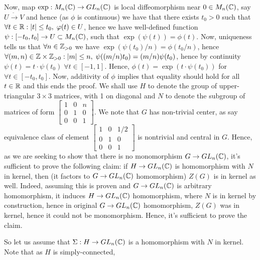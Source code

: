 \documentclass[8pt]{article} %
\begin{document}
Now, map $\exp:M_n(\mathbb{C})\to GL_n(\mathbb{C})$ is local diffeomorphism near $0\in M_n(\mathbb{C})$, say $U\xrightarrow{ \widetilde{} }V$
and hence (as $\phi$ is continuous) we have that
there exists $t_0>0$ such that $\forall t\in\mathbb{R}:\left|t\right|\leq t_0,\;\varphi(t)\in U$, hence we have well-defined function
$\psi:[-t_0,t_0]\to U\subset M_n(\mathbb{C})$, such that $\exp(\psi(t))=\phi(t)$. Now, uniqueness tells us that
$\forall n\in\mathbb{Z}_{>0}$ we have $\exp(\psi(t_0)/n)=\phi(t_0/n)$, hence $\forall (m,n)\in \mathbb{Z}\times\mathbb{Z}_{>0}:\left|m\right|\leq n,\;
\psi((m/n)t_0)=(m/n)\psi(t_0)$, hence by continuity $\psi(t)=t\cdot\psi(t_0)\;\forall t\in[-1,1]$. Hence, $\phi(t)=\exp(t\cdot
\psi(t_0))$ for $\forall t\in[-t_0,t_0]$. Now, additivity of $\phi$ implies that equality should hold for all $t\in\mathbb{R}$ and this
ends the proof.
We shall use $H$ to denote the group of upper-triangular $3\times3$ matrices, with 1 on diagonal and $N$ to denote the
subgroup of matrices of form $\left[\begin{smallmatrix}1&0&n\\0&1&0\\0&0&1\end{smallmatrix}\right]$.
We note that $G$ has non-trivial center, as say equivalence class of element
$\left[\begin{smallmatrix}1&0&1/2\\0&1&0\\0&0&1\end{smallmatrix}\right]$ is nontrivial and central in $G$. Hence, as we
are seeking to show that there is no monomorphism $G\to GL_n(\mathbb{C})$, it's sufficient to prove the following claim: if 
$H\to GL_n(\mathbb{C})$ is homomorphism with $N$ in kernel, then (it factors to $G\to GL_n(\mathbb{C})$ homomorphism) $Z(G)$ is in kernel as well.
Indeed, assuming this is proven and $G\to GL_n(\mathbb{C})$ is arbitrary
homomorphism, it induces $H\to GL_n(\mathbb{C})$ homomorphism, where $N$ is in
kernel by construction, hence in original $G\to GL_n(\mathbb{C})$ homomorphism, $Z(G)$ was in kernel, hence it could not be monomorphism. 
Hence, it's sufficient to prove the claim.\par
So let us assume that $\Sigma: H\to GL_n(\mathbb{C})$ is a homomorphism with $N$ in kernel. Note that as $H$ is simply-connected,
\end{document}

